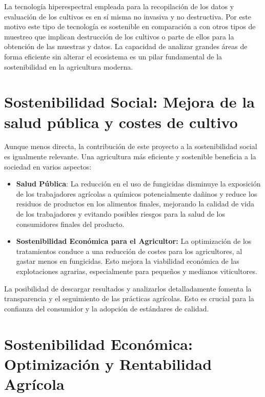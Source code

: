 La tecnología hiperespectral empleada para la recopilación de los datos y evaluación de los cultivos es en sí misma no invasiva y no destructiva. Por este motivo este tipo de tecnología es sostenible en comparación a con otros tipos de muestreo que implican destrucción de los cultivos o parte de ellos para la obtención de las muestras y datos.  La capacidad de analizar grandes áreas de forma eficiente sin alterar el ecosistema es un pilar fundamental de la sostenibilidad en la agricultura moderna.

\section{Sostenibilidad Social: Mejora de la salud pública y costes de cultivo}

Aunque menos directa, la contribución de este proyecto a la sostenibilidad social es igualmente relevante. Una agricultura más eficiente y sostenible beneficia a la sociedad en varios aspectos:
\begin{itemize}
    \item \textbf{Salud Pública}: La reducción en el uso de fungicidas disminuye la exposición de los trabajadores agrícolas a químicos potencialmente dañinos y reduce los residuos de productos en los alimentos finales, mejorando la calidad de vida de los trabajadores y evitando posibles riesgos para la salud de los consumidores finales del producto.

    \item \textbf{Sostenibilidad Económica para el Agricultor:} La optimización de los tratamientos conduce a una reducción de costes para los agricultores, al gastar menos en fungicidas. Esto mejora la viabilidad económica de las explotaciones agrarias, especialmente para pequeños y medianos viticultores.

\end{itemize}

La posibilidad de descargar resultados y analizarlos detalladamente  fomenta la transparencia y el seguimiento de las prácticas agrícolas. Esto es crucial para la confianza del consumidor y la adopción de estándares de calidad.

\section{Sostenibilidad Económica: Optimización y Rentabilidad Agrícola}

